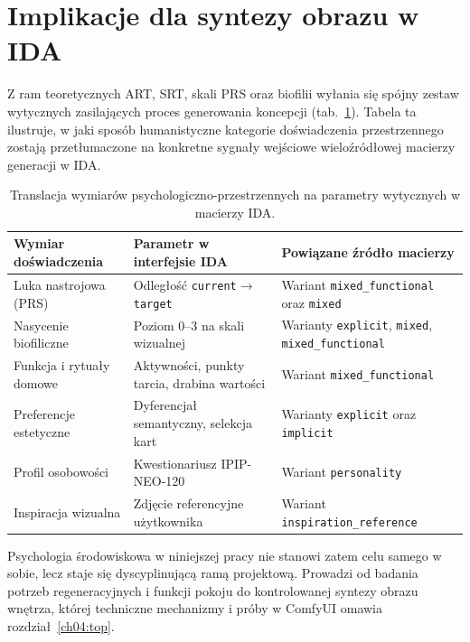 \section{Implikacje dla syntezy obrazu w IDA}
\label{ch02:sec:implikacje}

Z ram teoretycznych ART, SRT, skali PRS oraz biofilii wyłania się spójny zestaw wytycznych zasilających proces generowania koncepcji (tab.~\ref{tab:ch02:inputs-brief}).
Tabela ta ilustruje, w jaki sposób humanistyczne kategorie doświadczenia przestrzennego zostają przetłumaczone na konkretne sygnały wejściowe wieloźródłowej macierzy generacji w IDA.

\begin{table}[htbp]
  \centering
  \caption{Translacja wymiarów psychologiczno-przestrzennych na parametry wytycznych w macierzy IDA.}
  \label{tab:ch02:inputs-brief}
  \begin{tabular}{@{}>{\raggedright\arraybackslash}p{}>{\raggedright\arraybackslash}p{}>{\raggedright\arraybackslash}p{}@{}}
    \toprule
    Wymiar doświadczenia & Parametr w interfejsie IDA & Powiązane źródło macierzy \\
    \midrule
    Luka nastrojowa (PRS)
      & Odległość \texttt{current}$\rightarrow$\texttt{target}
      & Wariant \texttt{mixed\_functional} oraz \texttt{mixed} \\
    Nasycenie biofiliczne
      & Poziom 0--3 na skali wizualnej
      & Warianty \texttt{explicit}, \texttt{mixed}, \texttt{mixed\_functional} \\
    Funkcja i rytuały domowe
      & Aktywności, punkty tarcia, drabina wartości
      & Wariant \texttt{mixed\_functional} \\
    Preferencje estetyczne
      & Dyferencjał semantyczny, selekcja kart
      & Warianty \texttt{explicit} oraz \texttt{implicit} \\
    Profil osobowości
      & Kwestionariusz IPIP-NEO-120
      & Wariant \texttt{personality} \\
    Inspiracja wizualna
      & Zdjęcie referencyjne użytkownika
      & Wariant \texttt{inspiration\_reference} \\
    \bottomrule
  \end{tabular}
\end{table}

Psychologia środowiskowa w niniejszej pracy nie stanowi zatem celu samego w sobie, lecz staje się dyscyplinującą ramą projektową. Prowadzi od badania potrzeb regeneracyjnych i funkcji pokoju do kontrolowanej syntezy obrazu wnętrza, której techniczne mechanizmy i próby w ComfyUI omawia rozdział~\ref{ch04:top}.
